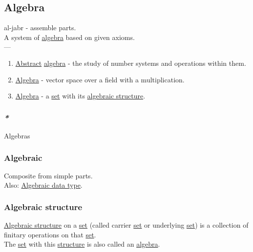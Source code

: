 \documentclass[11pt]{article}
\begin{document}
\subsection{\label{orgecde2fc}Algebra}
\label{sec:org41a5af0}
al-jabr - assemble parts.\\
A system of \hyperref[orgecde2fc]{algebra} based on given axioms.\\

---\\

\begin{enumerate}
\item \hyperref[org606d002]{Abstract} \hyperref[orgecde2fc]{algebra} - the study of number systems and operations within them.\\
\item \hyperref[orgecde2fc]{Algebra} - vector space over a field with a multiplication.\\
\item \hyperref[orgecde2fc]{Algebra} - a \hyperref[orgbed80ba]{set} with its \hyperref[org461d8c5]{algebraic structure}.\\
\end{enumerate}

\subsubsection{\emph{*}}
\label{sec:orgb0e3a0b}

\label{org238196c}Algebras\\

\subsubsection{\label{orgf3466c3}Algebraic}
\label{sec:orgd99eb2a}
Composite from simple parts.\\
Also: \hyperref[orgeba275a]{Algebraic data type}.\\

\subsubsection{\label{org461d8c5}Algebraic structure}
\label{sec:org6deefd9}
\hyperref[org461d8c5]{Algebraic structure} on a \hyperref[orgbed80ba]{set} (called carrier \hyperref[orgbed80ba]{set} or underlying \hyperref[orgbed80ba]{set}) is a collection of finitary operations on that \hyperref[orgbed80ba]{set}.\\
The \hyperref[orgbed80ba]{set} with this \hyperref[org93ee82c]{structure} is also called an \hyperref[orgecde2fc]{algebra}.\\
\end{document}
